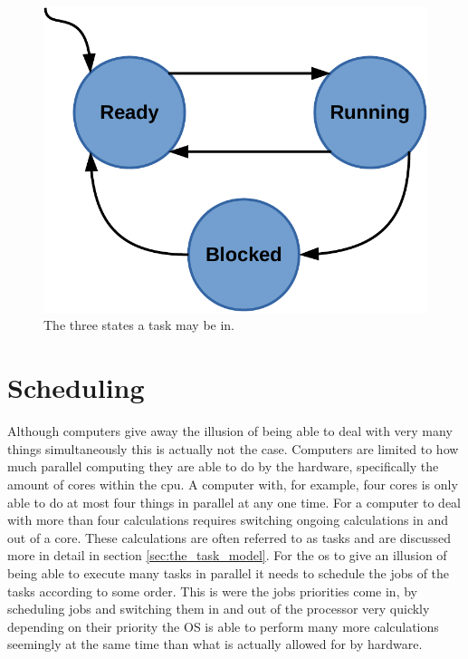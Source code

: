\documentclass{kththesis}
\begin{document}

\begin{figure}

    \centering

    \includegraphics[width=0.5\linewidth]{images/ready-running-blocked-model.pdf}

    \caption{The three states a task may be in.}

    \label{fig:ready-running-blocked-model}

\end{figure}


\section{Scheduling} \label{sec:scheduling}

Although computers give away the illusion of being able to deal with very many things simultaneously
this is actually not the case. Computers are limited to how much parallel computing they are able to
do by the hardware, specifically the amount of cores within the \acrshort{cpu}. A computer with,
for example, four cores is only able to do at most four things in parallel at any one time. For a
computer to deal with more than four calculations requires switching ongoing calculations in and out
of a core. These calculations are often referred to as tasks and are discussed more in detail in
section \ref{sec:the_task_model}. For the \acrshort{os} to give an illusion of being able to execute
many tasks in parallel it needs to schedule the jobs of the tasks according to some order. This is
were the jobs priorities come in, by scheduling jobs and switching them in and out of the processor
very quickly depending on their priority the OS is able to perform many more calculations seemingly
at the same time than what is actually allowed for by hardware.
\end{document}
